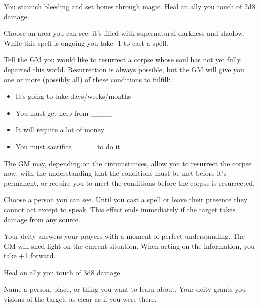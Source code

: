 

 You staunch bleeding and set bones through magic. Heal an ally you touch of 2d8 damage.





 Choose an area you can see: it's filled with supernatural darkness and shadow. While this spell is ongoing you take -1 to cast a spell.




 Tell the GM you would like to resurrect a corpse whose soul has not yet fully departed this world. Resurrection is always possible, but the GM will give you one or more (possibly all) of these conditions to fulfill:
\begin{itemize}
\item It's going to take days/weeks/months
\item You must get help from \_\_\_\_
\item It will require a lot of money
\item You must sacrifice \_\_\_\_ to do it

\end{itemize}


 The GM may, depending on the circumstances, allow you to resurrect the corpse now, with the understanding that the conditions must be met before it's permanent, or require you to meet the conditions before the corpse is resurrected.




 Choose a person you can see. Until you cast a spell or leave their presence they cannot act except to speak. This effect ends immediately if the target takes damage from any source.




 Your deity answers your prayers with a moment of perfect understanding. The GM will shed light on the current situation. When acting on the information, you take +1 forward.




 Heal an ally you touch of 3d8 damage.




 Name a person, place, or thing you want to learn about. Your deity grants you visions of the target, as clear as if you were there.

\newpage
{}



